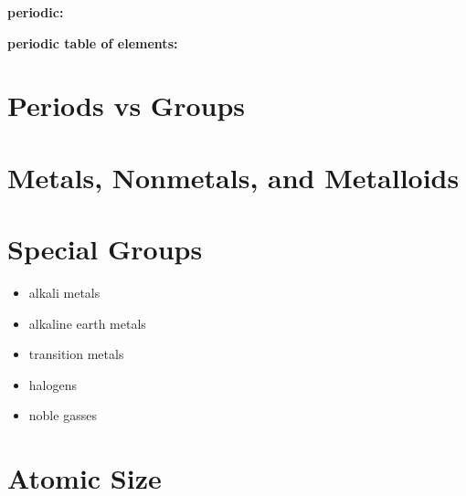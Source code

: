 \documentclass[landscape]{article}
\begin{document}
\begin{multicols*}{2}
  

\noindent
{\bf periodic:}
\vspace{3em}

\noindent
{\bf periodic table of elements:}
\vspace{3em}


\section*{Periods vs Groups}

\ptable


\section*{Metals, Nonmetals, and Metalloids}

\ptable

\columnbreak


\section*{Special Groups}

\ptable

\begin{itemize}[topsep=0pt,itemsep=-1ex,partopsep=1ex,parsep=1ex,label={}]
  \item alkali metals 
  \item alkaline earth metals 
  \item transition metals
  \item halogens
  \item noble gasses
\end{itemize}


\section*{Atomic Size}

\ptable








\end{multicols*}
\end{document}
